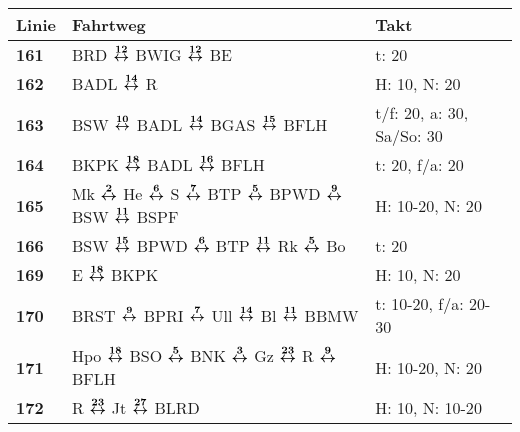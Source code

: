 \begin{minipage}[t]{0.45\textwidth}
\begin{tabular}{>{\bfseries}L{1.2cm}L{9.0cm}L{3.0cm}}
{\bfseries Linie} & {\bfseries Fahrtweg} & {\bfseries Takt} \\
\hline
\bus{} 161    & BRD $\boldsymbol{\overset{12}{\leftrightarrow}}$ BWIG $\boldsymbol{\overset{12}{\leftrightarrow}}$ BE                                                                                                                               & t: 20                      \\
\bus{} 162    & BADL $\boldsymbol{\overset{14}{\leftrightarrow}}$ R                                                                                                                                                 & H: 10, N: 20               \\
\bus{} 163    & BSW $\boldsymbol{\overset{10}{\leftrightarrow}}$ BADL $\boldsymbol{\overset{14}{\leftrightarrow}}$ BGAS $\boldsymbol{\overset{15}{\leftrightarrow}}$ BFLH                                                                                                           & t/f: 20, a: 30, Sa/So: 30  \\
\bus{} 164    & BKPK $\boldsymbol{\overset{18}{\leftrightarrow}}$ BADL $\boldsymbol{\overset{16}{\leftrightarrow}}$ BFLH                                                                                                            & t: 20, f/a: 20             \\
\bus{} 165    & Mk $\boldsymbol{\overset{2}{\leftrightarrow}}$ He $\boldsymbol{\overset{6}{\leftrightarrow}}$ S $\boldsymbol{\overset{7}{\leftrightarrow}}$ BTP $\boldsymbol{\overset{5}{\leftrightarrow}}$ BPWD $\boldsymbol{\overset{9}{\leftrightarrow}}$ BSW $\boldsymbol{\overset{11}{\leftrightarrow}}$ BSPF                                                                  & H: 10-20, N: 20            \\
\bus{} 166    & BSW $\boldsymbol{\overset{15}{\leftrightarrow}}$ BPWD $\boldsymbol{\overset{6}{\leftrightarrow}}$ BTP $\boldsymbol{\overset{11}{\leftrightarrow}}$ Rk $\boldsymbol{\overset{5}{\leftrightarrow}}$ Bo                                                                                                & t: 20                      \\
\bus{} 169    & E $\boldsymbol{\overset{18}{\leftrightarrow}}$ BKPK                                                                                                                                                 & H: 10, N: 20               \\
\bus{} 170    & BRST $\boldsymbol{\overset{9}{\leftrightarrow}}$ BPRI $\boldsymbol{\overset{7}{\leftrightarrow}}$ Ull $\boldsymbol{\overset{14}{\leftrightarrow}}$ Bl $\boldsymbol{\overset{11}{\leftrightarrow}}$ BBMW                                                                                             & t: 10-20, f/a: 20-30       \\
\bus{} 171    & Hpo $\boldsymbol{\overset{18}{\leftrightarrow}}$ BSO $\boldsymbol{\overset{5}{\leftrightarrow}}$ BNK $\boldsymbol{\overset{3}{\leftrightarrow}}$ Gz $\boldsymbol{\overset{23}{\leftrightarrow}}$ R $\boldsymbol{\overset{9}{\leftrightarrow}}$ BFLH                                                                  & H: 10-20, N: 20            \\
\bus{} 172    & R $\boldsymbol{\overset{23}{\leftrightarrow}}$ Jt $\boldsymbol{\overset{27}{\leftrightarrow}}$ BLRD                                                                                                                                 & H: 10, N: 10-20            \\

\end{tabular}
\end{minipage}
